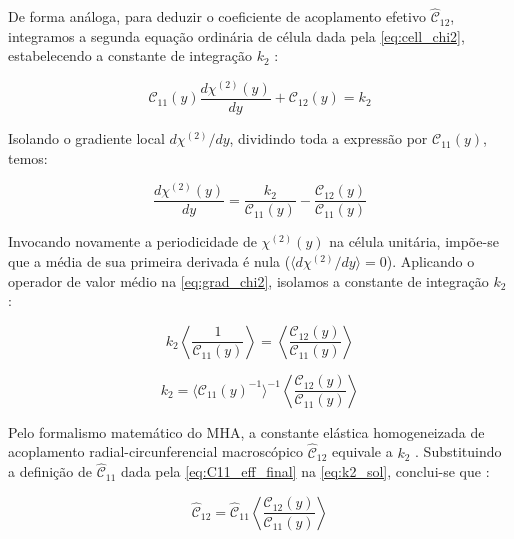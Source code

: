 De forma análoga, para deduzir o coeficiente de acoplamento efetivo $\hat{\mathcal{C}}_{12}$, integramos a segunda equação ordinária de célula dada pela \eqref{eq:cell_chi2}, estabelecendo a constante de integração $k_2$ \cite{Sadd2009}:

\begin{equation}
  \mathcal{C}_{11}(y) \frac{d \chi^{(2)}(y)}{d y} + \mathcal{C}_{12}(y) = k_2
  \label{eq:integ_chi2_1}
\end{equation}

Isolando o gradiente local $d \chi^{(2)} / d y$, dividindo toda a expressão por $\mathcal{C}_{11}(y)$, temos:

\begin{equation}
  \frac{d \chi^{(2)}(y)}{d y} = \frac{k_2}{\mathcal{C}_{11}(y)} - \frac{\mathcal{C}_{12}(y)}{\mathcal{C}_{11}(y)}
  \label{eq:grad_chi2}
\end{equation}

Invocando novamente a periodicidade de $\chi^{(2)}(y)$ na célula unitária, impõe-se que a média de sua primeira derivada é nula ($\langle d \chi^{(2)} / d y \rangle = 0$). Aplicando o operador de valor médio na \eqref{eq:grad_chi2}, isolamos a constante de integração $k_2$ \cite{bakhvalov1989}:

\begin{equation}
  k_2 \left\langle \frac{1}{\mathcal{C}_{11}(y)} \right\rangle = \left\langle \frac{\mathcal{C}_{12}(y)}{\mathcal{C}_{11}(y)} \right\rangle
  \label{eq:k2_solve_pre}
\end{equation}

\begin{equation}
  k_2 = \langle \mathcal{C}_{11}(y)^{-1} \rangle^{-1} \left\langle \frac{\mathcal{C}_{12}(y)}{\mathcal{C}_{11}(y)} \right\rangle
  \label{eq:k2_sol}
\end{equation}

Pelo formalismo matemático do MHA, a constante elástica homogeneizada de acoplamento radial-circunferencial macroscópico $\hat{\mathcal{C}}_{12}$ equivale a $k_2$ \cite{bakhvalov1989}. Substituindo a definição de $\hat{\mathcal{C}}_{11}$ dada pela \eqref{eq:C11_eff_final} na \eqref{eq:k2_sol}, conclui-se que \cite{bakhvalov1989}:

\begin{equation}
  \hat{\mathcal{C}}_{12} = \hat{\mathcal{C}}_{11} \left\langle \frac{\mathcal{C}_{12}(y)}{\mathcal{C}_{11}(y)} \right\rangle
  \label{eq:Chat12_Calculation}
\end{equation}

